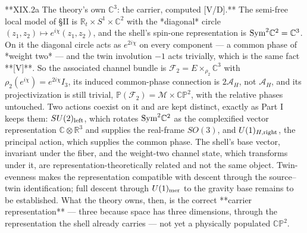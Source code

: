 **XIX.2a The theory's own $\mathbb C^3$: the carrier, computed [V/D].** The semi-free local model of §II is $\mathbb R_t\times S^1\times\mathbb C^2$ with the *diagonal* circle $(z_1,z_2)\mapsto e^{i\chi}(z_1,z_2)$, and the shell's spin-one representation is ${\rm Sym}^2\mathbb C^2 = \mathbb C^3$. On it the diagonal circle acts as $e^{2i\chi}$ on every component — a common phase of *weight two* — and the twin involution $-1$ acts trivially, which is the same fact **[V]**. So the associated channel bundle is $\mathcal F_2 = E\times_{\rho_2}\mathbb C^3$ with $\rho_2(e^{i\chi}) = e^{2i\chi}I_3$, its induced common-phase connection is $2\mathcal A_H$, not $\mathcal A_H$, and its projectivization is still trivial, $\mathbb P(\mathcal F_2) = \mathcal M\times\mathbb{CP}^2$, with the relative phases untouched. Two actions coexist on it and are kept distinct, exactly as Part I keeps them: $SU(2)_{\rm left}$, which rotates ${\rm Sym}^2\mathbb C^2$ as the complexified vector representation $\mathbb C\otimes\mathbb R^3$ and supplies the real-frame $SO(3)$, and $U(1)_{H,{\rm right} }$, the principal action, which supplies the common phase. The shell's base vector, invariant under the fiber, and the weight-two channel state, which transforms under it, are representation-theoretically related and not the same object. Twin-evenness makes the representation compatible with descent through the source–twin identification; full descent through $U(1)_{\rm mer}$ to the gravity base remains to be established. What the theory owns, then, is the correct **carrier representation** — three because space has three dimensions, through the representation the shell already carries — not yet a physically populated $\mathbb{CP}^2$.

